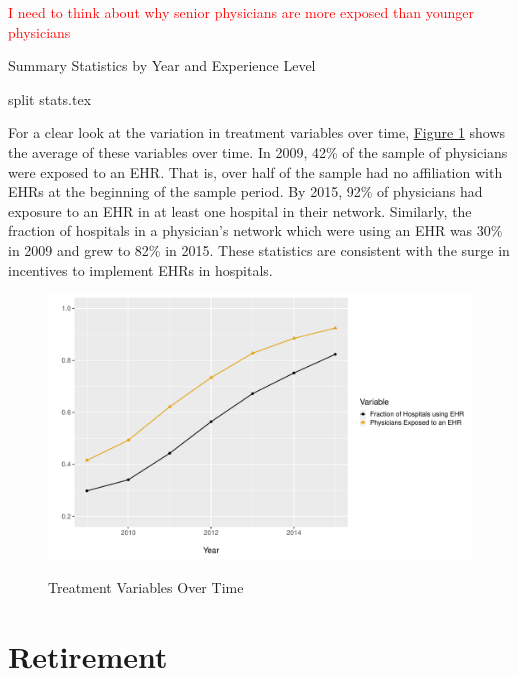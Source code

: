 \documentclass[11pt]{article}
\begin{document}
\textcolor{red}{I need to think about why senior physicians are more exposed than younger physicians}



\vspace{5mm}
\begin{table}[ht]
\caption{Summary Statistics by Year and Experience Level}
{split stats.tex}
\end{table}
\vspace{5mm}




For a clear look at the variation in treatment variables over time, \hyperref[fig:figure1]{Figure 1} shows the average of these variables over time. In 2009, 42\% of the sample of physicians were exposed to an EHR. That is, over half of the sample had no affiliation with EHRs at the beginning of the sample period. By 2015, 92\% of physicians had exposure to an EHR in at least one hospital in their network. Similarly, the fraction of hospitals in a physician's network which were using an EHR was 30\% in 2009 and grew to 82\% in 2015. These statistics are consistent with the surge in incentives to implement EHRs in hospitals. 

\vspace{5mm}
\begin{figure}[ht]
    \caption{Treatment Variables Over Time}
    \vspace{-2mm}
    \includegraphics[scale=.5]{Objects/sum_stats_year.pdf}
    \label{fig:figure1}
\end{figure}
\vspace{5mm}

\newpage

\section{Retirement}
\end{document}

